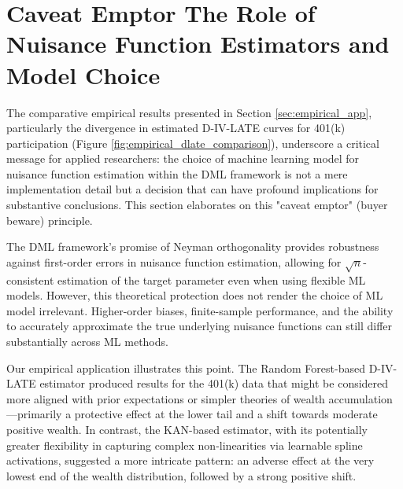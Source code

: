 \documentclass[final,3p,fleqn, 10pt]{elsarticle}
\begin{document}
\section{Caveat Emptor The Role of Nuisance Function Estimators and Model Choice}
\label{sec:caveat_emptor}

The comparative empirical results presented in Section \ref{sec:empirical_app}, particularly the divergence in estimated D-IV-LATE curves for 401(k) participation (Figure \ref{fig:empirical_dlate_comparison}), underscore a critical message for applied researchers: the choice of machine learning model for nuisance function estimation within the DML framework is not a mere implementation detail but a decision that can have profound implications for substantive conclusions. This section elaborates on this "caveat emptor" (buyer beware) principle.

The DML framework's promise of Neyman orthogonality provides robustness against first-order errors in nuisance function estimation, allowing for $\sqrt{n}$-consistent estimation of the target parameter even when using flexible ML models. However, this theoretical protection does not render the choice of ML model irrelevant. Higher-order biases, finite-sample performance, and the ability to accurately approximate the true underlying nuisance functions can still differ substantially across ML methods.

Our empirical application illustrates this point. The Random Forest-based D-IV-LATE estimator produced results for the 401(k) data that might be considered more aligned with prior expectations or simpler theories of wealth accumulation—primarily a protective effect at the lower tail and a shift towards moderate positive wealth. In contrast, the KAN-based estimator, with its potentially greater flexibility in capturing complex non-linearities via learnable spline activations, suggested a more intricate pattern: an adverse effect at the very lowest end of the wealth distribution, followed by a strong positive shift.
\end{document}
